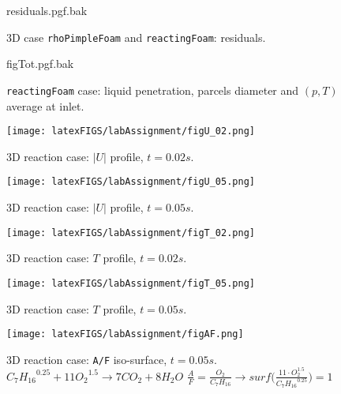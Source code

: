     \newpage

    \setcounter{lastPage}{\thepage}
    \setcounter{page}{1}
    \renewcommand{\thepage}{3DR-\roman{page}}

    \begin{figure}[!ht]
        \centering
        {residuals.pgf.bak}
        \cprotect\caption{3D case \verb|rhoPimpleFoam| and \verb|reactingFoam|: residuals.}
    \end{figure}

    \begin{figure}[!ht]
        \centering
        {figTot.pgf.bak}
        \cprotect\caption{\verb|reactingFoam| case: liquid penetration, parcels diameter and $(p, T)$ average at inlet.} 
    \end{figure}

    \begin{figure}[!ht]
        \centering
        \texttt{[image: latexFIGS/labAssignment/figU\_02.png]}
        \caption{3D reaction case: $|U|$ profile, $t = 0.02s$.}
    \end{figure}

    \begin{figure}[!ht]
        \centering
        \texttt{[image: latexFIGS/labAssignment/figU\_05.png]}
        \caption{3D reaction case: $|U|$ profile, $t = 0.05s$.}
    \end{figure}
    
    \begin{figure}[!ht]
        \centering
        \texttt{[image: latexFIGS/labAssignment/figT\_02.png]}
        \caption{3D reaction case: $T$ profile, $t = 0.02s$.}
    \end{figure}
    
    \begin{figure}[!ht]
        \centering
        \texttt{[image: latexFIGS/labAssignment/figT\_05.png]}
        \caption{3D reaction case: $T$ profile, $t = 0.05s$.}
    \end{figure}

    \begin{figure}[!ht]
        \centering
        \texttt{[image: latexFIGS/labAssignment/figAF.png]}
        \cprotect\caption[3D reaction case: \verb|A/F| iso-surface, $t = 0.05s$]{3D reaction case: \verb|A/F| iso-surface, $t = 0.05s$. \newline ${C_7H_{16}}^{0.25} + 11 {O_2}^{1.5} \rightarrow 7 CO_2 + 8 H_2O$ \newline $\frac{A}{F} = \frac{O_2}{C_7H_{16}} \rightarrow surf\big( \frac{11 \cdot O_2^{1.5}}{{C_7H_{16}}^{0.25}} \big) = 1$}
    \end{figure}
    
    \clearpage
